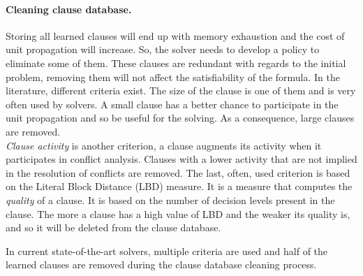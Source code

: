 \paragraph{Cleaning clause database.}
Storing  all learned clauses will end up with memory exhaustion and the cost of unit propagation will increase.
 So, the solver needs to develop a policy to eliminate some of them. These clauses are redundant with regards to the initial 
 problem, removing them will not affect the satisfiability of the formula.
  In the literature, different criteria exist.
 The size of the clause is one of them and is very often used by solvers. 
 A small clause has a better chance to participate in the unit propagation and so be useful for the solving.
 As a consequence, large clauses are removed.\\
\emph{Clause activity} is another criterion, a clause augments its activity when it participates in conflict analysis. 
Clauses with a lower activity that are not implied in the resolution of conflicts are removed.
 The last, often, used criterion is based on the Literal Block Distance (LBD) measure. It is a measure that computes the \emph{quality} of a clause.
It is based on the number of decision levels present in the clause. The more a clause has a high value of LBD and 
the weaker its quality is, and so it will be deleted from the clause database.
 
In current state-of-the-art solvers, multiple criteria are used and half of the learned clauses are removed during the clause database cleaning process.

